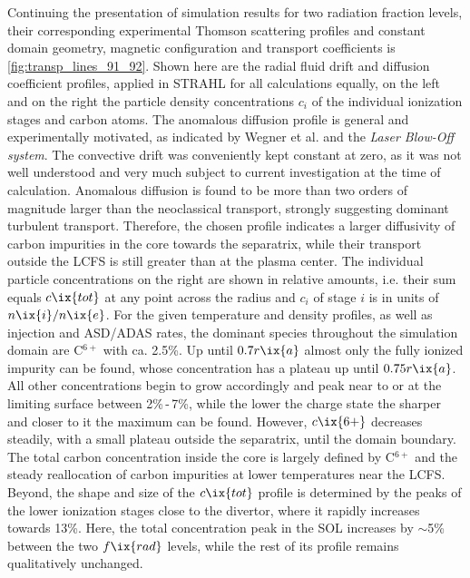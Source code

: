         Continuing the presentation of simulation results for two radiation fraction levels, their corresponding experimental Thomson scattering profiles and constant domain geometry, magnetic configuration and transport coefficients is \cref{fig:transp_lines_91_92}. Shown here are the radial fluid drift and diffusion coefficient profiles, applied in STRAHL for all calculations equally, on the left and on the right the particle density concentrations $c_{i}$ of the individual ionization stages and carbon atoms. The anomalous diffusion profile is general and experimentally motivated, as indicated by Wegner et al. and the \textit{Laser Blow-Off system}\cite{Klinger2019}. The convective drift was conveniently kept constant at zero, as it was not well understood and very much subject to current investigation at the time of calculation. Anomalous diffusion is found to be more than two orders of magnitude larger than the neoclassical transport, strongly suggesting dominant turbulent transport\cite{Klinger2019}. Therefore, the chosen profile indicates a larger diffusivity of carbon impurities in the core towards the separatrix, while their transport outside the LCFS is still greater than at the plasma center. The individual particle concentrations on the right are shown in relative amounts, i.e. their sum equals $c\ix{tot}$ at any point across the radius and $c_{i}$ of stage $i$ is in units of $n\ix{i}/n\ix{e}$. For the given temperature and density profiles, as well as injection and ASD/ADAS rates, the dominant species throughout the simulation domain are C$^{6+}$ with ca. 2.5\%. Up until $0.7r\ix{a}$ almost only the fully ionized impurity can be found, whose concentration has a plateau up until $0.75r\ix{a}$. All other concentrations begin to grow accordingly and peak near to or at the limiting surface between 2\%\,-\,7\%, while the lower the charge state the sharper and closer to it the maximum can be found. However, $c\ix{6+}$ decreases steadily, with a small plateau outside the separatrix, until the domain boundary. The total carbon concentration inside the core is largely defined by C$^{6+}$ and the steady reallocation of carbon impurities at lower temperatures near the LCFS. Beyond, the shape and size of the $c\ix{tot}$ profile is determined by the peaks of the lower ionization stages close to the divertor, where it rapidly increases towards 13\%. Here, the total concentration peak in the SOL increases by $\sim$5\% between the two $f\ix{rad}$ levels, while the rest of its profile remains qualitatively unchanged.\\%
